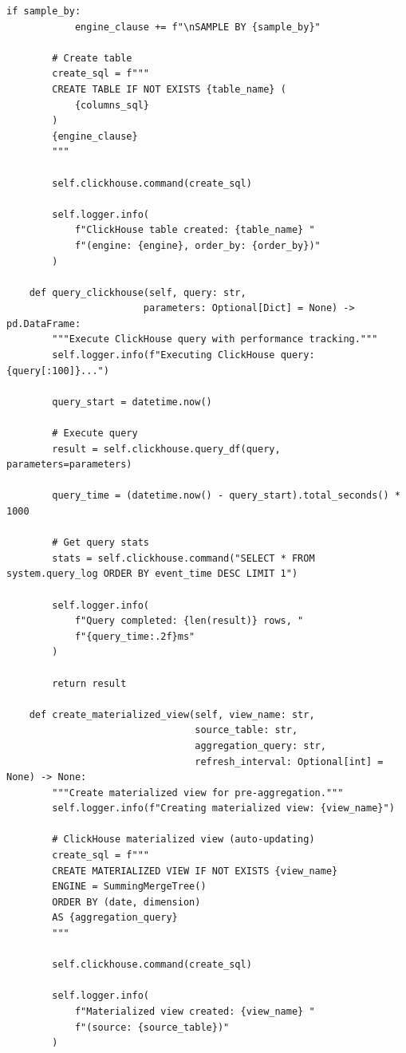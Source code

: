 \begin{lstlisting}[style=python, caption=RealtimeAnalyzer with Sub-Second Query Performance]
        if sample_by:
            engine_clause += f"\nSAMPLE BY {sample_by}"

        # Create table
        create_sql = f"""
        CREATE TABLE IF NOT EXISTS {table_name} (
            {columns_sql}
        )
        {engine_clause}
        """

        self.clickhouse.command(create_sql)

        self.logger.info(
            f"ClickHouse table created: {table_name} "
            f"(engine: {engine}, order_by: {order_by})"
        )

    def query_clickhouse(self, query: str,
                        parameters: Optional[Dict] = None) -> pd.DataFrame:
        """Execute ClickHouse query with performance tracking."""
        self.logger.info(f"Executing ClickHouse query: {query[:100]}...")

        query_start = datetime.now()

        # Execute query
        result = self.clickhouse.query_df(query, parameters=parameters)

        query_time = (datetime.now() - query_start).total_seconds() * 1000

        # Get query stats
        stats = self.clickhouse.command("SELECT * FROM system.query_log ORDER BY event_time DESC LIMIT 1")

        self.logger.info(
            f"Query completed: {len(result)} rows, "
            f"{query_time:.2f}ms"
        )

        return result

    def create_materialized_view(self, view_name: str,
                                 source_table: str,
                                 aggregation_query: str,
                                 refresh_interval: Optional[int] = None) -> None:
        """Create materialized view for pre-aggregation."""
        self.logger.info(f"Creating materialized view: {view_name}")

        # ClickHouse materialized view (auto-updating)
        create_sql = f"""
        CREATE MATERIALIZED VIEW IF NOT EXISTS {view_name}
        ENGINE = SummingMergeTree()
        ORDER BY (date, dimension)
        AS {aggregation_query}
        """

        self.clickhouse.command(create_sql)

        self.logger.info(
            f"Materialized view created: {view_name} "
            f"(source: {source_table})"
        )


\end{lstlisting}
